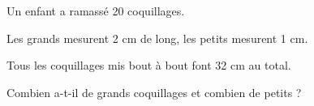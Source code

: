 
\bigskip

Un enfant a ramassé 20 coquillages.
 
Les grands mesurent 2 cm de long, les petits mesurent 1 cm.

Tous les coquillages mis bout à bout font 32 cm au total. 
 
Combien a-t-il de grands coquillages et combien de petits ?

\bigskip 

